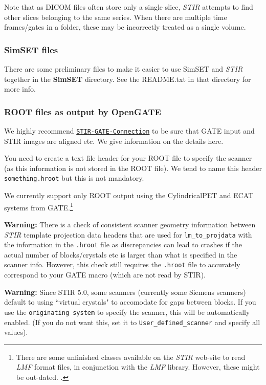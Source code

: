 \documentclass{article}
\def\url#1#2{\mbox{\href{#1}{\tt #2}}}
\begin{document}
Note that as DICOM files often store only a single slice, \textit{STIR} attempts to find
other slices belonging to the same series. When there are multiple time frames/gates in a folder, 
these may be incorrectly treated as a single volume.

\subsubsection{SimSET files}
There are some preliminary files to make it easier to use SimSET and \textit{STIR} together in the
\textbf{SimSET} directory. See the README.txt in that directory for more info.

\subsubsection{ROOT files as output by OpenGATE \label{sec:ROOTIO}}
We highly recommend
\url{https://github.com/UCL/STIR-GATE-Connection}{STIR-GATE-Connection} to be sure that GATE input
and STIR images are aligned etc.
We give information on the details here.

You need to create a text file header for your ROOT file
to specify the scanner (as this information is not stored in the ROOT file).
We tend to name this header \texttt{something.hroot} but this is not mandatory.

We currently support only ROOT output using the CylindricalPET and ECAT systems
from GATE.\footnote{There are some unfinished classes
available on the \textit{STIR} web-site to read \textit{LMF} format files,
in conjunction with the \textit{LMF} library. However, these might be out-dated.
.}

\textbf{Warning:} There is a check of consistent scanner geometry information between \textit{STIR} template projection data headers that are used for \texttt{lm\_to\_projdata}
with the information in the \texttt{.hroot} file
as discrepancies can lead to crashes if the actual number of blocks/crystals etc is
larger than what is specified in the scanner info. However, this check still requires the \texttt{.hroot}
file to accurately correspond to your GATE macro (which are not read by STIR).

\textbf{Warning:} Since STIR 5.0, some scanners (currently some Siemens scanners) default to using
``virtual crystals" to accomodate for gaps between blocks. If you use
the \texttt{originating system} to specify the scanner, this will be automatically enabled.
(If you do not want this, set it to \texttt{User\_defined\_scanner} and specify all values).
\end{document}
